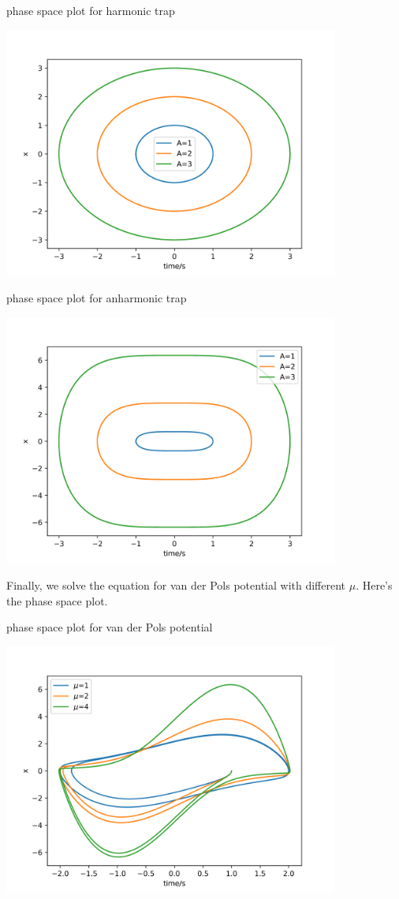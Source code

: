 \documentclass[letterpaper,12pt]{article}
\begin{document}
\begin{table}[!h]
    \centering
    \caption{phase space plot for harmonic trap}
    \includegraphics[width=11cm]{9-6d-1.png}
\end{table}%

\begin{table}[!h]
    \centering
    \caption{phase space plot for anharmonic trap}
    \includegraphics[width=11cm]{9-6d-2.png}
\end{table}%
\newpage

Finally, we solve the equation for van der Pols potential with different $\mu$. Here's the phase space plot.

\begin{table}[!h]
    \centering
    \caption{phase space plot for van der Pols potential}
    \includegraphics[width=11cm]{9-6e.png}
\end{table}%
\end{document}
